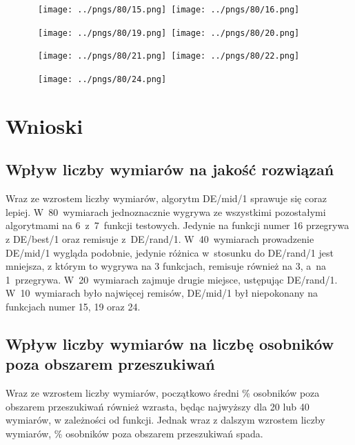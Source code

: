 \documentclass[a4paper,onecolumn,oneside,11pt,wide,floatssmall]{mwrep}
\theoremstyle{definition}
\theoremstyle{plain}%
\theoremstyle{remark}
\begin{document}
\begin{figure}[H]
\centering
\mbox{
\texttt{[image: ../pngs/80/15.png]} \quad
\texttt{[image: ../pngs/80/16.png]} 
}
\end{figure}

\begin{figure}[H]
\centering
\mbox{
\texttt{[image: ../pngs/80/19.png]} \quad
\texttt{[image: ../pngs/80/20.png]} 
}
\end{figure}

\begin{figure}[H]
\centering
\mbox{
\texttt{[image: ../pngs/80/21.png]} \quad
\texttt{[image: ../pngs/80/22.png]} 
}
\end{figure}

\begin{figure}[H]
\centering
\mbox{
\texttt{[image: ../pngs/80/24.png]} \quad
}
\end{figure}

\chapter{Wnioski}

\section{Wpływ liczby wymiarów na jakość rozwiązań}

Wraz ze wzrostem liczby wymiarów, algorytm DE/mid/1 sprawuje się coraz lepiej.
W~80~wymiarach jednoznacznie wygrywa ze wszystkimi pozostałymi algorytmami na 6~z~7~funkcji testowych.
Jedynie na funkcji numer 16 przegrywa z DE/best/1 oraz remisuje z~DE/rand/1.
W~40~wymiarach prowadzenie DE/mid/1 wygląda podobnie, jedynie różnica w~stosunku do DE/rand/1
jest mniejsza, z którym to wygrywa na 3 funkcjach, remisuje również na 3, a~na 1~przegrywa.
W~20~wymiarach zajmuje drugie miejsce, ustępując DE/rand/1.
W~10~wymiarach było najwięcej remisów, DE/mid/1 był niepokonany na funkcjach numer 15, 19 oraz 24.

\section{Wpływ liczby wymiarów na liczbę osobników poza obszarem przeszukiwań}

Wraz ze wzrostem liczby wymiarów, początkowo średni \% osobników poza obszarem przeszukiwań również 
wzrasta, będąc najwyższy dla 20 lub 40 wymiarów, w zależności od funkcji. Jednak wraz z dalszym
wzrostem liczby wymiarów, \% osobników poza obszarem przeszukiwań spada. 
\end{document}
